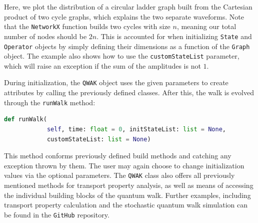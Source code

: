 \documentclass[main.tex]{subfiles}
\begin{document}
Here, we plot the distribution of a circular ladder graph built from the
Cartesian product of two cycle graphs, which explains the two separate
waveforms. Note that the \texttt{NetworkX} function builds two cycles with size
$n$, meaning our total number of nodes should be $2n$. This is accounted for
when initializing \texttt{State} and \texttt{Operator} objects by simply
defining their dimensions as a function of the \texttt{Graph} object. The
example also shows how to use the \texttt{customStateList} parameter, which
will raise an exception if the sum of the amplitudes is not $1$.\par

During initialization, the \texttt{QWAK} object uses the given parameters to
create attributes by calling the previously defined classes. After this, the
walk is evolved through the \texttt{runWalk} method: 
\begin{lstlisting}[style=commands,mathescape,language=Python]
    def runWalk(
            self, time: float = 0, initStateList: list = None, 
            customStateList: list = None) 
\end{lstlisting}
This method conforms previously defined build methods and catching any
exception thrown by them. The user may again choose to change initialization
values via the optional parameters. The \texttt{QWAK} class also offers all
previously mentioned methods for transport property analysis, as well as means
of accessing the individual building blocks of the quantum walk.  Further
examples, including transport property calculation and the stochastic quantum
walk simulation can be found in the \texttt{GitHub} repository. 
\end{document}
